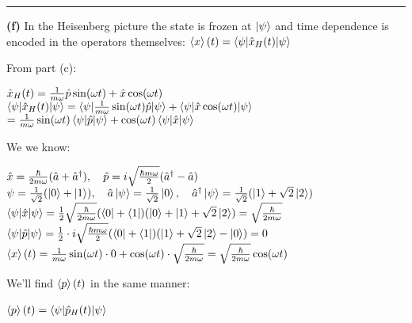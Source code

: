 \documentclass[14pt]{extarticle}
\makeatletter
\newenvironment{lefteqs}{%
    \begin{flushleft}%
    \renewcommand{\arraystretch}{1.3}%
    $\begin{array}{@{}l@{}}%
}{%
    \end{array}$%
    \end{flushleft}%
}
\makeatother
\begin{document}
\hrule
\vspace{2em}

\textbf{(f)}
In the Heisenberg picture the state is frozen at $\ket{\psi}$ and time dependence
is encoded in the operators themselves: $\braket{x}(t) = \braket{\psi | \hat{x}_H(t) | \psi}$

From part (c):

\begin{lefteqs}
    \hat{x}_H(t) = \frac{1}{m\omega} \hat{p} \sin(\omega t) + \hat{x} \cos(\omega t) \\
    \braket{\psi | \hat{x}_H(t) | \psi} = \braket{\psi | \frac{1}{m\omega} \sin(\omega t) \hat{p} | \psi} + \braket{\psi | \hat{x} \cos(\omega t) | \psi} \\
    = \frac{1}{m\omega} \sin(\omega t) \braket{\psi | \hat{p} | \psi} + \cos(\omega t) \braket{\psi | \hat{x} | \psi} \\
\end{lefteqs}

We we know:

\begin{lefteqs}
    \hat{x} = \frac{\hbar}{2m\omega} (\hat{a} + \hat{a}^\dagger) ,
    \quad \hat{p} = i \sqrt{\frac{\hbar m \omega}{2}} (\hat{a}^\dagger - \hat{a}) \\
    \psi = \frac{1}{\sqrt{2}} (\ket{0} + \ket{1}) ,
    \quad \hat{a} \ket{\psi} = \frac{1}{\sqrt{2}} \ket{0} ,
    \quad \hat{a}^\dagger \ket{\psi} = \frac{1}{\sqrt{2}} (\ket{1} + \sqrt{2} \ket{2}) \\
    \braket{\psi | \hat{x} | \psi} = \frac{1}{2} \sqrt{\frac{\hbar}{2m\omega}} (\bra{0} + \bra{1})(\ket{0} + \ket{1} + \sqrt{2}\ket{2})
    = \sqrt{\frac{\hbar}{2m\omega}} \\
    \braket{\psi | \hat{p} | \psi} = \frac{1}{2} \cdot i \sqrt{\frac{\hbar m \omega}{2}} (\bra{0} + \bra{1})(\ket{1} + \sqrt{2}\ket{2} - \ket{0}) = 0 \\
    \braket{x}(t) = \frac{1}{m\omega} \sin(\omega t) \cdot 0 + \cos(\omega t) \cdot \sqrt{\frac{\hbar}{2m\omega}} = \sqrt{\frac{\hbar}{2m\omega}} \cos(\omega t) \\
\end{lefteqs}

We'll find $\braket{p}(t)$ in the same manner:

\begin{lefteqs}
    \braket{p}(t) = \braket{\psi | \hat{p}_H(t) | \psi} \\
\end{lefteqs}
\end{document}
